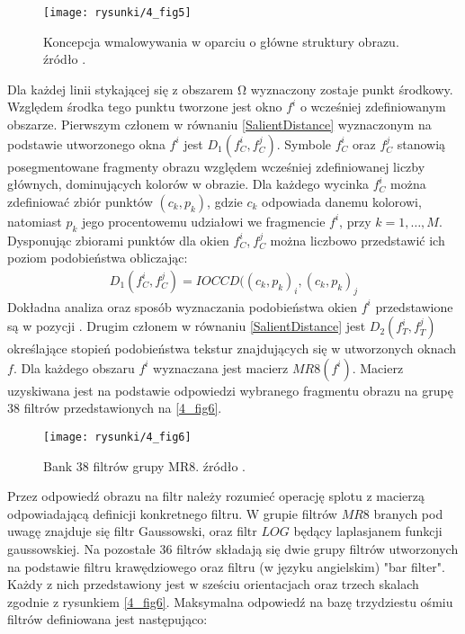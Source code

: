 \documentclass[12pt, twoside, openany]{report}
\theoremstyle{definition}
\begin{document}
\begin{figure}[!h]
	\centering
	\texttt{[image: rysunki/4\_fig5]}
	\caption{Koncepcja wmalowywania w oparciu o główne struktury obrazu. źródło \cite{StructurePropagationManual}.}
	\label{4_fig5} 
\end{figure}
Dla każdej linii stykającej się z obszarem $\mathrm{\Omega }$ wyznaczony zostaje punkt środkowy. Względem środka tego punktu tworzone jest okno  $f^i$ o wcześniej zdefiniowanym obszarze. Pierwszym członem w równaniu \eqref{SalientDistance} wyznaczonym na podstawie utworzonego okna $f^i$ jest $D_1\left(f^i_C,f^j_C\right)$. Symbole $f^i_C$ oraz $f^j_C$ stanowią posegmentowane fragmenty obrazu względem wcześniej zdefiniowanej liczby głównych, dominujących kolorów w obrazie. Dla każdego wycinka $f^i_C$ można zdefiniować zbiór punktów $(c_k,p_k)$, gdzie $c_k$ odpowiada danemu kolorowi, natomiast $p_k$ jego procentowemu udziałowi we fragmencie $f^i$, przy $k=1,\dots ,M$. Dysponując zbiorami punktów dla okien $f^i_C$,$\ f^j_C$ można liczbowo przedstawić ich poziom podobieństwa obliczając: 
\begin{align}
D_1\left(f^i_C,f^j_C\right)=IOCCD({\left(c_k,p_k\right)}_i,{\left(c_k,p_k\right)}_j
\label{colDistance}
\end{align}
Dokładna analiza oraz sposób wyznaczania podobieństwa okien $f^i$ przedstawione są w pozycji \cite{chen2005adaptive}.
Drugim członem w równaniu \eqref{SalientDistance} jest $D_2\left(f^i_T,f^j_T\right)$ określające stopień podobieństwa tekstur znajdujących się w utworzonych oknach $f$. Dla każdego obszaru $f^i$ wyznaczana jest macierz $MR8(f^i)$. Macierz uzyskiwana jest na podstawie odpowiedzi wybranego fragmentu obrazu na grupę 38 filtrów przedstawionych na \autoref{4_fig6}.
\begin{figure}[!h]
	\centering
	\texttt{[image: rysunki/4\_fig6]}
	\caption{Bank 38 filtrów grupy MR8. źródło \cite{varma2009statistical}.}
\label{4_fig6}
\end{figure}
Przez odpowiedź obrazu na filtr należy rozumieć operację splotu z macierzą odpowiadającą definicji konkretnego filtru. W grupie filtrów $MR8$ branych pod uwagę znajduje się filtr Gaussowski, oraz filtr $LOG$ będący laplasjanem funkcji gaussowskiej. Na pozostałe 36 filtrów składają się dwie grupy filtrów utworzonych na podstawie filtru krawędziowego oraz filtru (w języku angielskim) "bar filter". Każdy z nich przedstawiony jest w sześciu orientacjach oraz trzech skalach zgodnie z rysunkiem \autoref{4_fig6}. Maksymalna odpowiedź na bazę trzydziestu ośmiu filtrów definiowana jest następująco:
\end{document}
